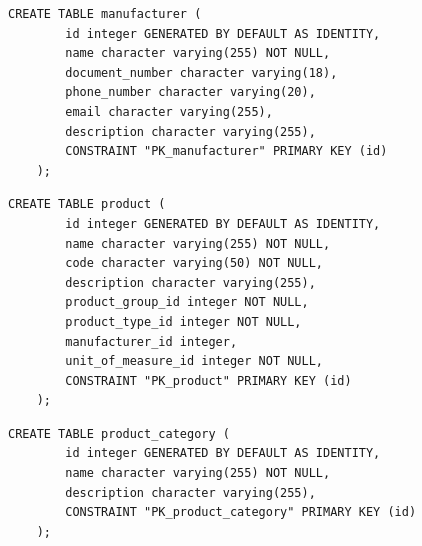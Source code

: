 \begin{quadro}[H]
	\caption[Script SQL --- Tabela \texttt{manufacturer}]{Script SQL --- Tabela \texttt{manufacturer}}
	\label{quadro:script-manufacturer}
	
	\begin{minipage}{0.96\textwidth}
		\begin{lstlisting}[style=academic-sql]
	CREATE TABLE manufacturer (
		id integer GENERATED BY DEFAULT AS IDENTITY,
		name character varying(255) NOT NULL,
		document_number character varying(18),
		phone_number character varying(20),
		email character varying(255),
		description character varying(255),
		CONSTRAINT "PK_manufacturer" PRIMARY KEY (id)
	);
		\end{lstlisting}
	\end{minipage}
	
\end{quadro}

\begin{quadro}[H]
	\caption[Script SQL --- Tabela \texttt{product}]{Script SQL --- Tabela \texttt{product}}
	\label{quadro:script-product}
	
	\begin{minipage}{0.96\textwidth}
		\begin{lstlisting}[style=academic-sql]
	CREATE TABLE product (
		id integer GENERATED BY DEFAULT AS IDENTITY,
		name character varying(255) NOT NULL,
		code character varying(50) NOT NULL,
		description character varying(255),
		product_group_id integer NOT NULL,
		product_type_id integer NOT NULL,
		manufacturer_id integer,
		unit_of_measure_id integer NOT NULL,
		CONSTRAINT "PK_product" PRIMARY KEY (id)
	);
		\end{lstlisting}
	\end{minipage}
	
\end{quadro}

\begin{quadro}[H]
	\caption[Script SQL --- Tabela \texttt{product\_category}]{Script SQL --- Tabela \texttt{product\_category}}
	\label{quadro:script-product-category}
	
	\begin{minipage}{0.96\textwidth}
		\begin{lstlisting}[style=academic-sql]
	CREATE TABLE product_category (
		id integer GENERATED BY DEFAULT AS IDENTITY,
		name character varying(255) NOT NULL,
		description character varying(255),
		CONSTRAINT "PK_product_category" PRIMARY KEY (id)
	);
		\end{lstlisting}
	\end{minipage}
	
\end{quadro}

